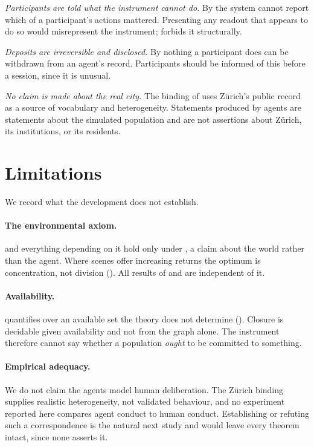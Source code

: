 \documentclass[11pt,a4paper]{article}
\theoremstyle{clstyle}
\theoremstyle{definition}
\theoremstyle{remark}
\begin{document}
\emph{Participants are told what the instrument cannot do.} By
 the system cannot report which of a participant's
actions mattered. Presenting any readout that appears to do so would
misrepresent the instrument;  forbids it structurally.

\emph{Deposits are irreversible and disclosed.} By  nothing
a participant does can be withdrawn from an agent's record. Participants
should be informed of this before a session, since it is unusual.

\emph{No claim is made about the real city.} The binding of
 uses Z{\"u}rich's public record as a source of vocabulary and
heterogeneity. Statements produced by agents are statements about the
simulated population and are not assertions about Z{\"u}rich, its institutions,
or its residents.

\section{Limitations}
\label{sec:limits}

We record what the development does not establish.

\paragraph{The environmental axiom.}  and everything
depending on it hold only under , a claim about the world
rather than the agent. Where scenes offer increasing returns the optimum is
concentration, not division (). All results of
 and
 are independent of it.

\paragraph{Availability.}  quantifies over an available set
the theory does not determine (). Closure is decidable
given availability and not from the graph alone. The instrument therefore
cannot say whether a population \emph{ought} to be committed to something.

\paragraph{Empirical adequacy.} We do not claim the agents model human
deliberation. The Z{\"u}rich binding supplies realistic heterogeneity, not
validated behaviour, and no experiment reported here compares agent conduct
to human conduct. Establishing or refuting such a correspondence is the
natural next study and would leave every theorem intact, since none asserts
it.
\end{document}
